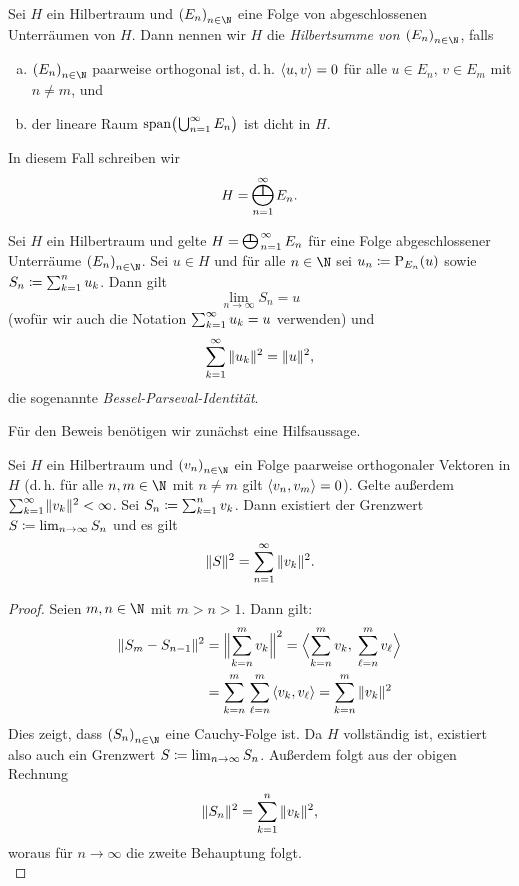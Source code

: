 \begin{thDef}
    Sei $H$ ein Hilbertraum und $\nSeq E$ eine Folge von abgeschlossenen 
    Unterräumen von $H$. Dann nennen wir $H$ die \emph{Hilbertsumme von
    $\nSeq E$}, falls
    \begin{enumerate}[(a)]
        \item 
            $\nSeq E$ paarweise orthogonal ist, d.\,h. $\left\langle u,v\right\rangle=0$ für alle
            $u\in E_n,\, v\in E_m$ mit $n\neq m$, und
        \item
            der lineare Raum $\operatorname{span}\bigl(\mkern1mu \bigcup_{n=1}^\infty E_n \bigr)$ 
            ist dicht in $H$.
    \end{enumerate}
    In diesem Fall schreiben wir
    \[ H = \hilbertsum_{n=1}^\infty E_n . \]
\end{thDef}


\begin{thSatz} \label{vl14:satz6.14}
    Sei $H$ ein Hilbertraum und gelte $H = \texthilbertsum_{n=1}^\infty E_n$ für
    eine Folge abgeschlossener Unterräume $\nSeq E$.
    Sei $u\in H$ und für alle $n\in\N$ sei $u_n \coloneqq \operatorname{P}_{E_n}(u)$ sowie
    $S_n \coloneqq \sum_{k=1}^n u_k$. Dann gilt \[ \lim_{n\to\infty} S_n = u \] 
    (wofür wir auch die Notation $\sum_{k=1}^\infty u_k = u$ verwenden) und
    \[ \sum_{k=1}^\infty \, \lVert u_k\rVert^2 = \lVert u\rVert^2  , \] 
    die sogenannte \emph{Bessel-Parseval-Identität}.
\end{thSatz}

Für den Beweis benötigen wir zunächst eine Hilfsaussage.
%
\begin{thLemma} \label{vl14:lemma6.15}
    Sei $H$ ein Hilbertraum und $\nSeq v$ ein Folge paarweise orthogonaler
    Vektoren in $H$ (d.\,h. für alle $n,m\in\N$ mit $n\neq m$ gilt
    $\left\langle v_n,v_m\right\rangle=0$). 
    Gelte außerdem $\sum_{k=1}^\infty\mkern1mu \lVert v_k\rVert^2 < \infty$.
    Sei $S_n \coloneqq \sum_{k=1}^n v_k$.  Dann existiert der Grenzwert $S\coloneqq
    \lim_{n\to\infty} S_n$ und es gilt 
    \[ \lVert S\rVert^2 = \sum_{n=1}^\infty \, \lVert v_k\rVert^2  . \]
\end{thLemma}

\begin{proof}
    Seien $m,n\in\N$ mit $m>n>1$. Dann gilt:
    \begin{align*}
        \norm{S_m-S_{n-1}}^2
        &= \norm[\Big]{ \ksum[n]^m v_k  }^2
         = \SPa[\Big]{ \ksum[n]^m v_k, \; \sum_{\ell=n}^m v_\ell }
        \\
        &= \sum_{k=n}^m \, \sum_{\ell=n}^m \, \SP{v_k,v_\ell} 
         = \ksum[n]^m \, \norm{v_k}^2
    \end{align*}
    Dies zeigt, dass $\nSeq S$ eine Cauchy-Folge ist. Da $H$ vollständig ist,
    existiert also auch ein Grenzwert $S \coloneqq \lim_{n\to\infty} S_n$.
    Außerdem folgt aus der obigen Rechnung
    \[ \lVert S_n\rVert^2 = \sum_{k=1}^n \, \lVert v_k\rVert^2  , \]
    woraus für $n\to\infty$ die zweite Behauptung folgt.
    \\
\end{proof}

